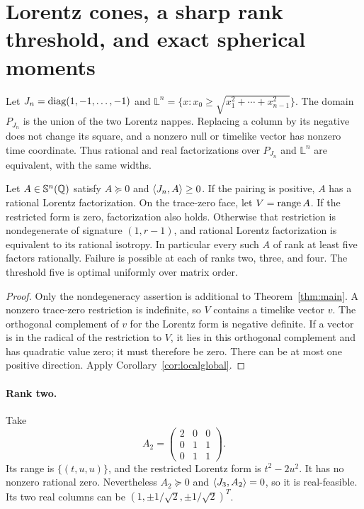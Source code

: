 \section{Lorentz cones, a sharp rank threshold, and exact spherical moments}
Let $J_n=\operatorname{diag}(1,-1,\ldots,-1)$ and $\mathbb L^n=\{x:x_0\geq\sqrt{x_1^2+\cdots+x_{n-1}^2}\}$. The domain $P_{J_n}$ is the union of the two Lorentz nappes. Replacing a column by its negative does not change its square, and a nonzero null or timelike vector has nonzero time coordinate. Thus rational and real factorizations over $P_{J_n}$ and $\mathbb L^n$ are equivalent, with the same widths.

\begin{theorem}\label{thm:lorentz}
Let $A\in\mathbb S^n(\mathbb Q)$ satisfy $A\succeq0$ and $\langle J_n,A\rangle\geq0$. If the pairing is positive, $A$ has a rational Lorentz factorization. On the trace-zero face, let $V=\operatorname{range} A$. If the restricted form is zero, factorization also holds. Otherwise that restriction is nondegenerate of signature $(1,r-1)$, and rational Lorentz factorization is equivalent to its rational isotropy. In particular every such $A$ of rank at least five factors rationally. Failure is possible at each of ranks two, three, and four. The threshold five is optimal uniformly over matrix order.
\end{theorem}
\begin{proof}
Only the nondegeneracy assertion is additional to Theorem~\ref{thm:main}. A nonzero trace-zero restriction is indefinite, so $V$ contains a timelike vector $v$. The orthogonal complement of $v$ for the Lorentz form is negative definite. If a vector is in the radical of the restriction to $V$, it lies in this orthogonal complement and has quadratic value zero; it must therefore be zero. There can be at most one positive direction. Apply Corollary~\ref{cor:localglobal}.
\end{proof}

\paragraph{Rank two.}
Take
\[
 A_2=\begin{pmatrix}2&0&0\\0&1&1\\0&1&1\end{pmatrix}.
\]
Its range is $\{(t,u,u)\}$, and the restricted Lorentz form is $t^2-2u^2$. It has no nonzero rational zero. Nevertheless $A_2\succeq0$ and $\langle J_3,A_2\rangle=0$, so it is real-feasible. Its two real columns can be $(1,\pm1/\sqrt2,\pm1/\sqrt2)^T$.

